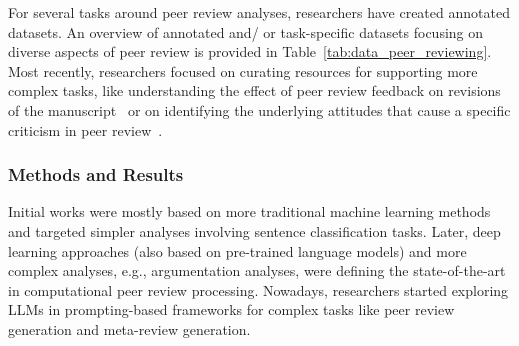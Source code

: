 %
%
%
For several tasks around peer review analyses, researchers have created annotated datasets. An overview of annotated and/ or task-specific datasets focusing on diverse aspects of peer review is provided in Table~\ref{tab:data_peer_reviewing}. %
Most recently, researchers focused on curating resources for supporting more complex tasks, like understanding the effect of peer review feedback on revisions of the manuscript~\cite{d2023aries} or on identifying the underlying attitudes that cause a specific criticism in peer review~\cite{purkayastha-etal-2023-exploring}.


\subsubsection{Methods and Results}

Initial works were mostly based on more traditional machine learning methods and targeted simpler analyses involving sentence classification tasks. Later, deep learning approaches (also based on pre-trained language models) and more complex analyses, e.g., argumentation analyses, were defining the state-of-the-art in computational peer review processing. Nowadays, researchers started exploring %
LLMs 
in prompting-based frameworks for complex tasks like peer review generation and meta-review generation. 


